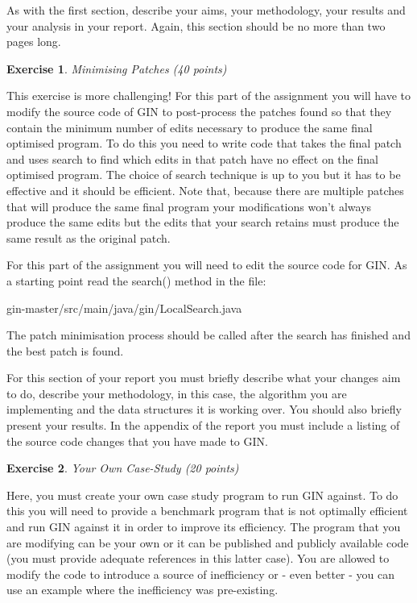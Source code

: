\documentclass{pracs}
\newtheorem{exercise}{Exercise}
\begin{document}
As with the first section, describe your aims, your methodology, your results and your analysis in your report. Again, this section should be no more than two pages long.






\begin{exercise}
Minimising Patches (40 points)
\end{exercise}

This exercise is more challenging! For this part of the assignment you will have to modify the source code of GIN to post-process the patches found so that they contain the minimum number of edits necessary to produce the same final optimised program. To do this you need to write code that takes the final patch and uses search to find which edits in that patch have no effect on the final optimised program. The choice of search technique is up to you but it has to be effective and it should be efficient. Note that, because there are multiple patches that will produce the same final program your modifications won’t always produce the same edits but the edits that your search retains must produce the same result as the original patch. 

For this part of the assignment you will need to edit the source code for GIN. As a starting point read the search() method in the file:

gin-master/src/main/java/gin/LocalSearch.java

The patch minimisation process should be called after the search has finished and the best patch is found. 

For this section of your report you must briefly describe what your changes aim to do, describe your methodology, in this case, the algorithm you are implementing and the data structures it is working over. You should also briefly present your results. In the appendix of the report you must include a listing of the source code changes that you have made to GIN.



\begin{exercise}
Your Own Case-Study (20 points)
\end{exercise}

Here, you must create your own case study program to run GIN against. To do this you will need to provide a benchmark program that is not optimally efficient and run GIN against it in order to improve its efficiency. The program that you are modifying can be your own or it can be published and publicly available code (you must provide adequate references in this latter case). You are allowed to modify the code to introduce a source of inefficiency or - even better - you can use an example where the inefficiency was pre-existing. 
\end{document}
